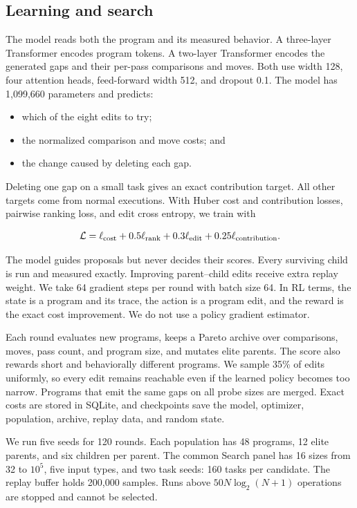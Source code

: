 \subsection{Learning and search}

The model reads both the program and its measured behavior.  A three-layer
Transformer encodes program tokens.  A two-layer Transformer encodes the
generated gaps and their per-pass comparisons and moves.  Both use width 128,
four attention heads, feed-forward width 512, and dropout 0.1.  The model has
1,099,660 parameters and predicts:

\begin{itemize}
  \item which of the eight edits to try;
  \item the normalized comparison and move costs; and
  \item the change caused by deleting each gap.
\end{itemize}

Deleting one gap on a small task gives an exact contribution target.  All
other targets come from normal executions.  With Huber cost and contribution
losses, pairwise ranking loss, and edit cross entropy, we train with

\begin{equation}
  \mathcal L=\ell_{\rm cost}+0.5\ell_{\rm rank}
  +0.3\ell_{\rm edit}+0.25\ell_{\rm contribution}.
  \label{eq:training-loss}
\end{equation}

The model guides proposals but never decides their scores.  Every surviving
child is run and measured exactly.  Improving parent--child edits receive
extra replay weight.  We take 64 gradient steps per round with batch size 64.
In RL terms, the state is a program and its trace, the action is a program
edit, and the reward is the exact cost improvement.  We do not use a policy
gradient estimator.

Each round evaluates new programs, keeps a Pareto archive over comparisons,
moves, pass count, and program size, and mutates elite parents.  The score also
rewards short and behaviorally different programs.  We sample 35\% of edits
uniformly, so every edit remains reachable even if the learned policy becomes
too narrow.  Programs that emit the same gaps on all probe sizes are merged.
Exact costs are stored in SQLite, and checkpoints save the model, optimizer,
population, archive, replay data, and random state.

We run five seeds for 120 rounds.  Each population has 48 programs, 12 elite
parents, and six children per parent.  The common Search panel has 16 sizes
from 32 to $10^5$, five input types, and two task seeds: 160 tasks per
candidate.  The replay buffer holds 200,000 samples.  Runs above
$50N\log_2(N+1)$ operations are stopped and cannot be selected.

